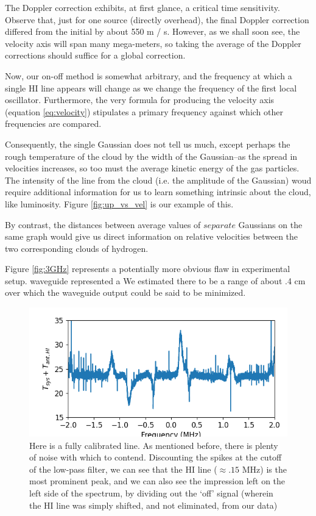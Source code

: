 \documentclass[12pt]{article}
\begin{document}
The Doppler correction exhibits, at first glance, a critical time sensitivity. Observe that, just for one source (directly overhead), the final Doppler correction differed from the initial by about 550 m / s. However, as we shall soon see, the velocity axis will span many mega-meters, so taking the average of the Doppler corrections should suffice for a global correction.

Now, our on-off method is somewhat arbitrary, and the frequency at which a single HI line appears will change as we change the frequency of the first local oscillator. Furthermore, the very formula for producing the velocity axis (equation \ref{eq:velocity}) stipulates a primary frequency against which other frequencies are compared.

Consequently, the single Gaussian does not tell us much, except perhaps the rough temperature of the cloud by the width of the Gaussian--as the spread in velocities increases, so too must the average kinetic energy of the gas particles. The intensity of the line from the cloud (i.e. the amplitude of the Gaussian) woud require additional information for us to learn something intrinsic about the cloud, like luminosity. Figure \ref{fig:up_vs_vel} is our example of this.

By contrast, the distances between average values of $separate$ Gaussians on the same graph would give us direct information on relative velocities between the two corresponding clouds of hydrogen. 

Figure \ref{fig:3GHz} represents a potentially more obvious flaw in experimental setup.  waveguide represented a We estimated there to be a range of about .4 cm over which the waveguide output could be said to be minimized. 

\begin{figure}
	\centering
	\includegraphics[width=.6\linewidth]{up_vs_frq}
	\caption{Here is a fully calibrated line. As mentioned before, there is plenty of noise with which to contend. Discounting the spikes at the cutoff of the low-pass filter, we can see that the HI line ($\approx .15$ MHz) is the most prominent peak, and we can also see the impression left on the left side of the spectrum, by dividing out the `off' signal (wherein the HI line was simply shifted, and not eliminated, from our data)}
	\label{fig:up_vs_frq}
\end{figure}
\end{document}
